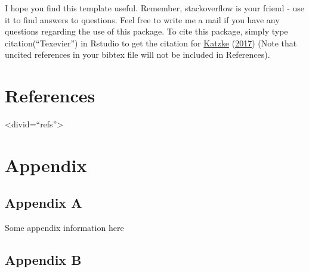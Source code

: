 \documentclass[11pt,preprint, authoryear]{elsarticle}
\numberwithin{equation}{section}
\numberwithin{figure}{section}
\numberwithin{table}{section}
\begin{document}
I hope you find this template useful. Remember, stackoverflow is your
friend - use it to find answers to questions. Feel free to write me a
mail if you have any questions regarding the use of this package. To
cite this package, simply type citation(``Texevier'') in Rstudio to get
the citation for \protect\hyperlink{ref-Texevier}{Katzke}
(\protect\hyperlink{ref-Texevier}{2017}) (Note that uncited references
in your bibtex file will not be included in References).

\newpage

\hypertarget{references}{%
\section*{References}\label{references}}

\textless divid=``refs''\textgreater{}

\newpage

\hypertarget{appendix}{%
\section*{Appendix}\label{appendix}}

\hypertarget{appendix-a}{%
\subsection*{Appendix A}\label{appendix-a}}

Some appendix information here

\hypertarget{appendix-b}{%
\subsection*{Appendix B}\label{appendix-b}}
\end{document}
